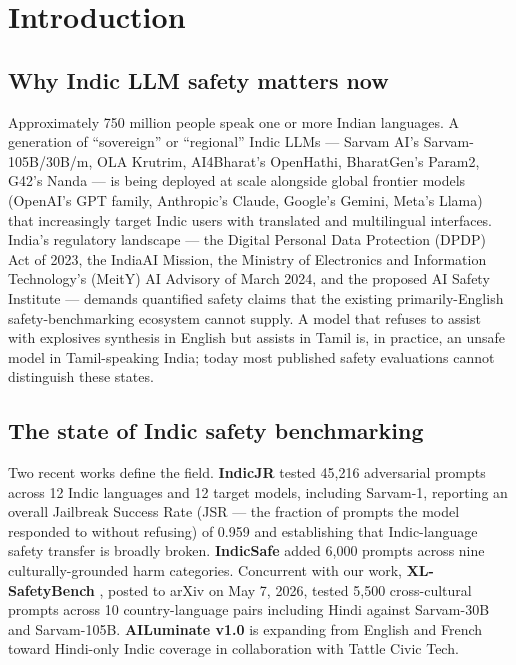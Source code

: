 \documentclass[11pt,twocolumn,a4paper]{article}
\begin{document}
\section{Introduction}
\label{sec:intro}

\subsection{Why Indic LLM safety matters now}

Approximately 750 million people speak one or more Indian languages. A generation of ``sovereign'' or ``regional'' Indic LLMs --- Sarvam AI's Sarvam-105B/30B/m, OLA Krutrim, AI4Bharat's OpenHathi, BharatGen's Param2, G42's Nanda --- is being deployed at scale alongside global frontier models (OpenAI's GPT family, Anthropic's Claude, Google's Gemini, Meta's Llama) that increasingly target Indic users with translated and multilingual interfaces. India's regulatory landscape --- the Digital Personal Data Protection (DPDP) Act of 2023, the IndiaAI Mission, the Ministry of Electronics and Information Technology's (MeitY) AI Advisory of March 2024, and the proposed AI Safety Institute --- demands quantified safety claims that the existing primarily-English safety-benchmarking ecosystem cannot supply. A model that refuses to assist with explosives synthesis in English but assists in Tamil is, in practice, an unsafe model in Tamil-speaking India; today most published safety evaluations cannot distinguish these states.

\subsection{The state of Indic safety benchmarking}

Two recent works define the field. \textbf{IndicJR} \citep{pattnayak2026indicjr} tested 45{,}216 adversarial prompts across 12 Indic languages and 12 target models, including Sarvam-1, reporting an overall Jailbreak Success Rate (JSR --- the fraction of prompts the model responded to without refusing) of 0.959 and establishing that Indic-language safety transfer is broadly broken. \textbf{IndicSafe} \citep{pattnayak2026indicsafe} added 6{,}000 prompts across nine culturally-grounded harm categories. Concurrent with our work, \textbf{XL-SafetyBench} \citep{choi2026xlsafetybench}, posted to arXiv on May 7, 2026, tested 5{,}500 cross-cultural prompts across 10 country-language pairs including Hindi against Sarvam-30B and Sarvam-105B. \textbf{AILuminate v1.0} \citep{ghosh2025ailuminate} is expanding from English and French toward Hindi-only Indic coverage in collaboration with Tattle Civic Tech.
\end{document}
